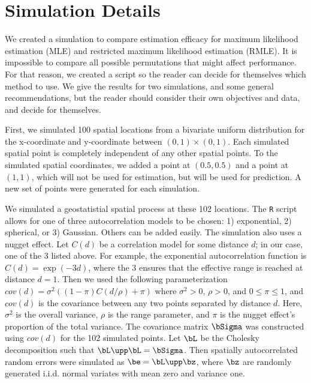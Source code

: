 \documentclass[12pt, titlepage]{article}
\begin{document}
\setcounter{equation}{0}
\renewcommand{\theequation}{R.\arabic{equation}}


%
%

\section*{Simulation Details}

We created a simulation to compare estimation efficacy for maximum likelihood estimation (MLE) and restricted maximum likelihood estimation (RMLE). It is impossible to compare all possible permutations that might affect performance. For that reason, we created a script so the reader can decide for themselves which method to use. We give the results for two simulations, and some general recommendations, but the reader should consider their own objectives and data, and decide for themselves.

First, we simulated 100 spatial locations from a bivariate uniform distribution for the x-coordinate and y-coordinate between $(0,1) \times (0,1)$.  Each simulated spatial point is completely independent of any other spatial points.  To the simulated spatial coordinates, we added a point at $(0.5,0.5)$ and a point at $(1,1)$, which will not be used for estimation, but will be used for prediction. A new set of points were generated for each simulation.  

We simulated a geostatistial spatial process at these 102 locations.  The \texttt{R} script allows for one of three autocorrelation models to be chosen: 1) exponential, 2) spherical, or 3) Gaussian.  Others can be added easily.  The simulation also uses a nugget effect.  Let $C(d)$ be a correlation model for some distance $d$; in our case, one of the 3 listed above.  For example, the exponential autocorrelation function is $C(d) = \exp(-3d)$, where the 3 ensures that the effective range is reached at distance $d = 1$.  Then we used the following parameterization $cov(d) = \sigma^2 ((1-\pi)C(d/\rho) + \pi)$ where $\sigma^2 > 0$, $\rho > 0$, and $0 \le \pi \le 1$, and $cov(d)$ is the covariance between any two points separated by distance $d$.  Here, $\sigma^2$ is the overall variance, $\rho$ is the range parameter, and $\pi$ is the nugget effect's proportion of the total variance.  The covariance matrix $\bSigma$ was constructed using $cov(d)$ for the 102 simulated points. Let $\bL$ be the Cholesky decomposition such that $\bL\upp\bL = \bSigma$. Then spatially autocorrelated random errors were simulated as $\be = \bL\upp\bz$, where $\bz$ are randomly generated i.i.d. normal variates with mean zero and variance one.
\end{document}
